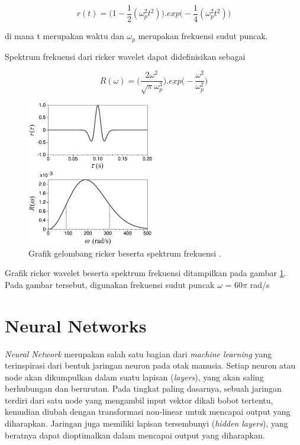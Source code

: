 \begin{equation}
  \label{eq:rickerTimeDomain}
  r(t) =  \big(1 -  \frac{1}{2} (  \omega _{p} ^{2}  t^{2} ) \big)  . exp \big(- \frac{1}{4} ( \omega _{p} ^{2}  t^{2} ) \big) 
\end{equation}

di mana t merupakan waktu dan $\omega_{p}$ merupakan frekuensi sudut puncak.

Spektrum frekuensi dari ricker wavelet dapat didefinisikan sebagai

\begin{equation}
  \label{eq:rickerTimeDomain}
  R( \omega ) =  \big( \frac{2 \omega ^{2}}{  \sqrt{ \pi }  \omega _{p} ^{3}} \big)  . exp \big(- \frac{ \omega ^{2}}{ \omega _{p} ^{2}} \big) 
\end{equation}

\begin{figure}[ht]
  \centering
  \includegraphics[scale=0.7]{gambar/ricker.jpg}
  \caption{Grafik gelombang ricker beserta spektrum frekuensi \parencite{rickerWavelet}.}
  \label{fig:gelombangRicker}
\end{figure}

Grafik ricker wavelet beserta spektrum frekuensi ditampilkan pada gambar \ref{fig:gelombangRicker}. 
Pada gambar tersebut, digunakan frekuensi sudut puncak $\omega$ = 60$\pi$ rad/s

\section{Neural Networks}
\label{sec:neuralNetworks}

\emph{Neural Network} merupakan salah satu bagian dari \emph{machine learning} yang terinspirasi dari bentuk jaringan neuron pada otak manusia. 
Setiap neuron atau node akan dikumpulkan dalam suatu lapisan (\emph{layers}), yang akan saling berhubungan dan berurutan. 
Pada tingkat paling dasarnya, sebuah jaringan terdiri dari satu node yang mengambil input vektor dikali bobot tertentu, kemudian diubah dengan transformasi non-linear untuk mencapai output yang diharapkan. 
Jaringan juga memiliki lapisan tersembunyi (\emph{hidden layers}), yang beratnya dapat dioptimalkan dalam mencapai output yang diharapkan.

